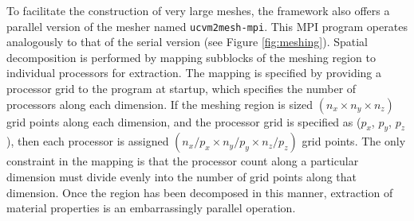 To facilitate the construction of very large meshes, the framework also offers a parallel version of the mesher named \texttt{ucvm2mesh-mpi}. This MPI program operates analogously to that of the serial version (see Figure \ref{fig:meshing}). Spatial decomposition is performed by mapping subblocks of the meshing region to individual processors for extraction. The mapping is specified by providing a processor grid to the program at startup, which specifies the number of processors along each dimension. If the meshing region is sized $(n_x \times n_y \times n_z)$ grid points along each dimension, and the processor grid is specified as ($p_x$, $p_y$, $p_z$), then each processor is assigned $(n_x/p_x \times n_y/p_y \times n_z/p_z)$ grid points. The only constraint in the mapping is that the processor count along a particular dimension must divide evenly into the number of grid points along that dimension. Once the region has been decomposed in this manner, extraction of material properties is an embarrassingly parallel operation.  
